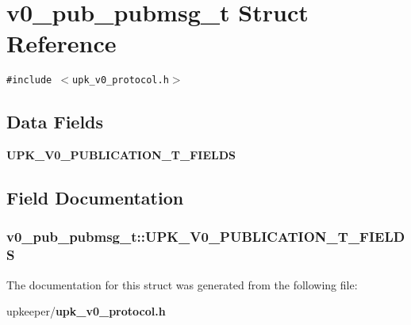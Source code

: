 \section{v0\_\-pub\_\-pubmsg\_\-t Struct Reference}
\label{structv0__pub__pubmsg__t}
{\tt \#include $<$upk\_\-v0\_\-protocol.h$>$}

\subsection*{Data Fields}
\begin{CompactItemize}
\item 
\bf{UPK\_\-V0\_\-PUBLICATION\_\-T\_\-FIELDS}
\end{CompactItemize}


\subsection{Field Documentation}
\subsubsection{\setlength{\rightskip}{0pt plus 5cm}\bf{v0\_\-pub\_\-pubmsg\_\-t::UPK\_\-V0\_\-PUBLICATION\_\-T\_\-FIELDS}}\label{structv0__pub__pubmsg__t_f2eb67c8130ec8cc18a5d2c7805a23ce}




The documentation for this struct was generated from the following file:\begin{CompactItemize}
\item 
upkeeper/\bf{upk\_\-v0\_\-protocol.h}\end{CompactItemize}
